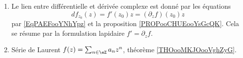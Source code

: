 
\begin{enumerate}
	\item
	      Le lien entre différentielle et dérivée complexe est donné par les équations
	      \begin{equation}
		      df_{z_0}(z)=f'(z_0)z=(\partial_zf)(z_0)z
	      \end{equation}
	      par \eqref{EqPAEFooYNhYpz} et la proposition \ref{PROPooCHUEooYsGcQK}. Cela se résume par la formulation lapidaire \( f'=\partial_zf\).
	\item
	      Série de Laurent \( f(z)=\sum_{n\in \eZ}a_nz^n\), théorème \ref{THOooMKJOooVghZyG}.
\end{enumerate}

